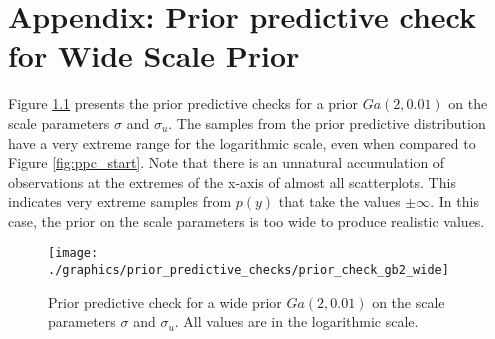 \chapter{Appendix: Prior predictive check for Wide Scale Prior}
\label{appendix:wide_prior}

Figure \ref{fig:ppc_wide} presents the prior predictive checks for a prior $Ga(2, 0.01)$ on the scale parameters $\sigma$ and $\sigma_u$.
The samples from the prior predictive distribution have a very extreme range for the logarithmic scale, even when compared to Figure \ref{fig:ppc_start}.
Note that there is an unnatural accumulation of observations at the extremes of the x-axis of almost all scatterplots.
This indicates very extreme samples from $p(y)$ that take the values $\pm \infty$.
In this case, the prior on the scale parameters is too wide to produce realistic values.

\begin{figure}[h]
    \centering
    \texttt{[image: ./graphics/prior\_predictive\_checks/prior\_check\_gb2\_wide]}
    \caption[Prior predictive check for wide scale prior.]{Prior predictive check for a wide prior $Ga(2, 0.01)$ on the scale parameters $\sigma$ and $\sigma_u$. All values are in the logarithmic scale.}
    \label{fig:ppc_wide}
\end{figure}

